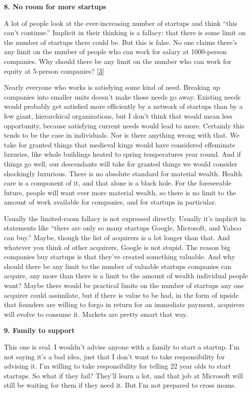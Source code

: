 \textbf{8. No room for more startups}

A lot of people look at the ever-increasing number of startups and think
``this can't continue.'' Implicit in their thinking is a fallacy: that
there is some limit on the number of startups there could be. But this
is false. No one claims there's any limit on the number of people who
can work for salary at 1000-person companies. Why should there be any
limit on the number who can work for equity at 5-person companies?
{[}\hyperref[f3n]{3}{]}

Nearly everyone who works is satisfying some kind of need. Breaking up
companies into smaller units doesn't make those needs go away. Existing
needs would probably get satisfied more efficiently by a network of
startups than by a few giant, hierarchical organizations, but I don't
think that would mean less opportunity, because satisfying current needs
would lead to more. Certainly this tends to be the case in individuals.
Nor is there anything wrong with that. We take for granted things that
medieval kings would have considered effeminate luxuries, like whole
buildings heated to spring temperatures year round. And if things go
well, our descendants will take for granted things we would consider
shockingly luxurious. There is no absolute standard for material wealth.
Health care is a component of it, and that alone is a black hole. For
the foreseeable future, people will want ever more material wealth, so
there is no limit to the amount of work available for companies, and for
startups in particular.

Usually the limited-room fallacy is not expressed directly. Usually it's
implicit in statements like ``there are only so many startups Google,
Microsoft, and Yahoo can buy.'' Maybe, though the list of acquirers is a
lot longer than that. And whatever you think of other acquirers, Google
is not stupid. The reason big companies buy startups is that they've
created something valuable. And why should there be any limit to the
number of valuable startups companies can acquire, any more than there
is a limit to the amount of wealth individual people want? Maybe there
would be practical limits on the number of startups any one acquirer
could assimilate, but if there is value to be had, in the form of upside
that founders are willing to forgo in return for an immediate payment,
acquirers will evolve to consume it. Markets are pretty smart that way.

\textbf{9. Family to support}

This one is real. I wouldn't advise anyone with a family to start a
startup. I'm not saying it's a bad idea, just that I don't want to take
responsibility for advising it. I'm willing to take responsibility for
telling 22 year olds to start startups. So what if they fail? They'll
learn a lot, and that job at Microsoft will still be waiting for them if
they need it. But I'm not prepared to cross moms.

